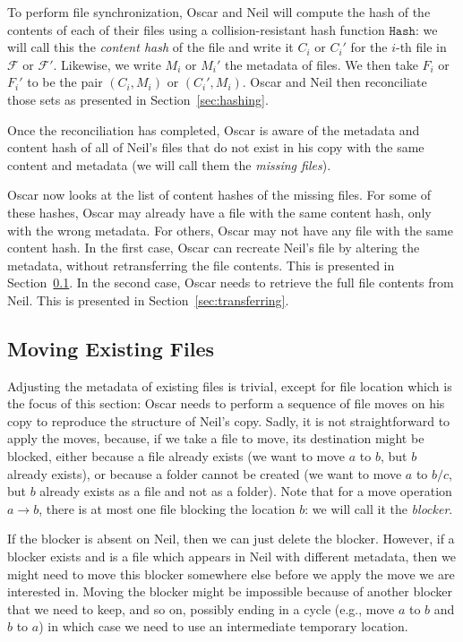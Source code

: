 \documentclass[twoside,envcountsame,runningheads]{llncs}
\newcommand{\Files}{\mathcal{F}}
\newcommand{\Hash}{\ensuremath{\mathtt{Hash}}}
\begin{document}
To perform file synchronization, Oscar and Neil will compute the hash of the
contents of each of their files using a collision-resistant hash function
$\Hash$: we will call this the \emph{content hash} of the file and write it
$C_i$ or $C_i'$ for the $i$-th file in $\Files$ or $\Files'$. Likewise, we
write $M_i$ or $M_i'$ the metadata of files. We then take $F_i$ or $F_i'$ to be
the pair $(C_i, M_i)$ or $(C_i', M_i)$. Oscar and Neil then reconciliate those
sets as presented in Section~\ref{sec:hashing}.

Once the reconciliation has completed, Oscar is aware of the metadata and
content hash of all of Neil's files that do not exist in his copy with the same
content and metadata (we will call them the \emph{missing files}).

Oscar now looks at the list of content hashes of the missing files. For some of
these hashes, Oscar may already have a file with the same content hash, only
with the wrong metadata. For others, Oscar may not have any file with the same
content hash. In the first case, Oscar can recreate Neil's file by altering the
metadata, without retransferring the file contents. This is presented in
Section~\ref{sec:moving}. In the second case, Oscar needs to retrieve the full
file contents from Neil. This is presented in Section~\ref{sec:transferring}.

\subsection{Moving Existing Files}
\label{sec:moving}

Adjusting the metadata of existing files is trivial, except for file location which is the focus of this section: Oscar needs to perform a sequence of file moves on his copy to reproduce the structure of Neil's copy. Sadly, it is not straightforward to apply the moves, because, if we take a file to move, its destination might be blocked, either because a file already exists (we want to move $a$ to $b$, but $b$ already exists), or because a folder cannot be created (we want to move $a$ to $b/c$, but $b$ already exists as a file and not as a folder). Note that for a move operation $a \rightarrow b$, there is at most one file blocking the location $b$: we will call it the \textit{blocker}.

If the blocker is absent on Neil, then we can just delete the blocker. However, if a blocker exists and is a file which appears in Neil with different metadata, then we might need to move this blocker somewhere else before we apply the move we are interested in. Moving the blocker might be impossible because of another blocker that we need to keep, and so on, possibly ending in a cycle (e.g., move $a$ to $b$ and $b$ to $a$) in which case we need to use an intermediate temporary location.
\end{document}
